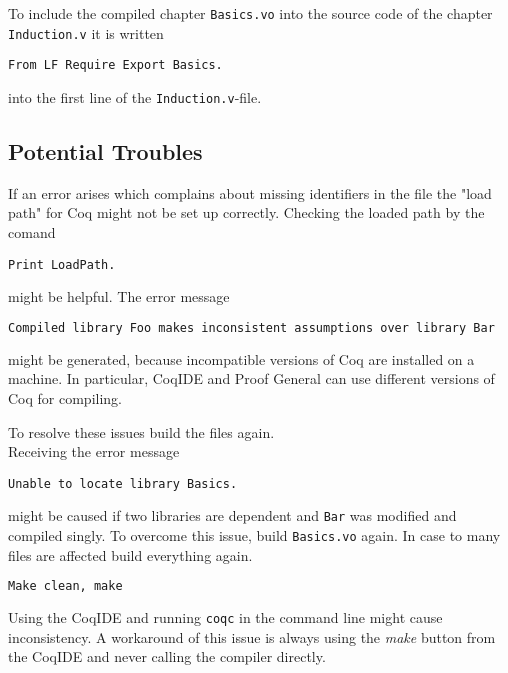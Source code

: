 To include the compiled chapter \texttt{Basics.vo} into the source code of the chapter \texttt{Induction.v} it is written
\begin{lstlisting}
From LF Require Export Basics.
\end{lstlisting}
into the first line of the \texttt{Induction.v}-file.

 

\subsection{Potential Troubles}

If an error arises which complains about missing identifiers in the file the "load path" for Coq might not be set up correctly.
Checking the loaded path by the comand
\begin{lstlisting}
Print LoadPath.  
\end{lstlisting} 
might be helpful. The error message
\begin{lstlisting}[language = bash]
  Compiled library Foo makes inconsistent assumptions over library Bar
\end{lstlisting}
might be generated, because incompatible versions of Coq are installed on a machine.
In particular,  CoqIDE and Proof General can use different versions of Coq for compiling. 

To resolve these issues build the files again.\\

Receiving the error message 
\begin{lstlisting}
Unable to locate library Basics.
\end{lstlisting}
might be caused if two libraries are dependent and \texttt{Bar} was modified and compiled singly.
To overcome this issue, build \texttt{Basics.vo} again.
In case to many files are affected build everything again.
\begin{lstlisting}[language=bash]
Make clean, make
\end{lstlisting}

Using the CoqIDE and running \texttt{coqc} in the command line might cause inconsistency. 
A workaround of this issue is always using the {\itshape make} button from the CoqIDE and never calling the compiler directly.
